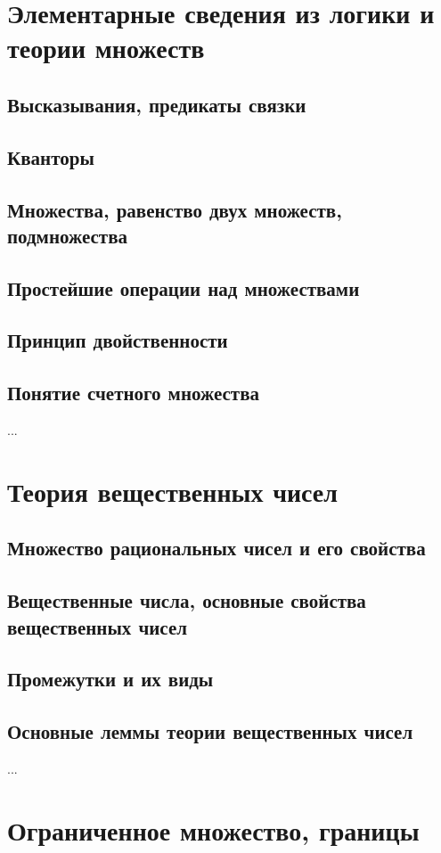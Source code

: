 \section{Элементарные сведения из логики и теории множеств}
\subsection{Высказывания, предикаты связки}
\subsection{Кванторы}
\subsection{Множества, равенство двух множеств, подмножества}
\subsection{Простейшие операции над множествами}
\subsection{Принцип двойственности}
\subsection{Понятие счетного множества}
...

\section{Теория вещественных чисел}
\subsection{Множество рациональных чисел и его свойства}
\subsection{Вещественные числа, основные свойства вещественных чисел}
\subsection{Промежутки и их виды}
\subsection{Основные леммы теории вещественных чисел}
...

\section{Ограниченное множество, границы}
